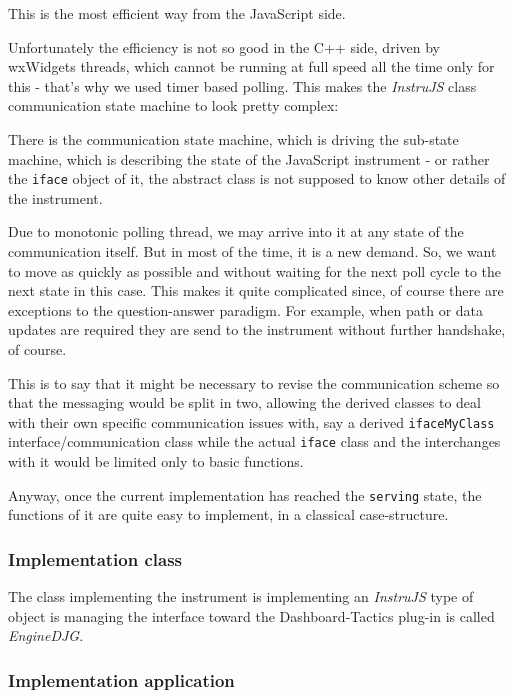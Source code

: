 \documentclass[11pt]{article}
\begin{document}
    This is the most efficient way from the JavaScript side.

    Unfortunately the efficiency is not so good in the C++ side, driven by
wxWidgets threads, which cannot be running at full speed all the time
only for this - that's why we used timer based polling. This makes the
\emph{InstruJS} class communication state machine to look pretty
complex:

    There is the communication state machine, which is driving the sub-state
machine, which is describing the state of the JavaScript instrument - or
rather the \texttt{iface} object of it, the abstract class is not
supposed to know other details of the instrument.

    Due to monotonic polling thread, we may arrive into it at any state of
the communication itself. But in most of the time, it is a new demand.
So, we want to move as quickly as possible and without waiting for the
next poll cycle to the next state in this case. This makes it quite
complicated since, of course there are exceptions to the question-answer
paradigm. For example, when path or data updates are required they are
send to the instrument without further handshake, of course.

    This is to say that it might be necessary to revise the communication
scheme so that the messaging would be split in two, allowing the derived
classes to deal with their own specific communication issues with, say a
derived \texttt{ifaceMyClass} interface/communication class while the
actual \texttt{iface} class and the interchanges with it would be
limited only to basic functions.

    Anyway, once the current implementation has reached the \texttt{serving}
state, the functions of it are quite easy to implement, in a classical
case-structure.

    \hypertarget{implementation-class}{%
\subsubsection{Implementation class}\label{implementation-class}}

    The class implementing the instrument is implementing an \emph{InstruJS}
type of object is managing the interface toward the Dashboard-Tactics
plug-in is called \emph{EngineDJG}.

    \hypertarget{implementation-application}{%
\subsubsection{Implementation
application}\label{implementation-application}}
\end{document}
